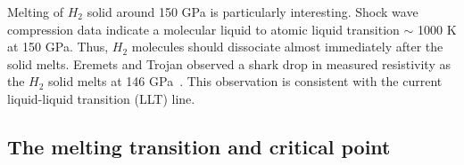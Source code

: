 Melting of $H_2$ solid around 150 GPa is particularly interesting. Shock wave compression data indicate a molecular liquid to atomic liquid transition $\sim$ 1000 K at 150 GPa. Thus, $H_2$ molecules should dissociate almost immediately after the solid melts. Eremets and Trojan observed a shark drop in measured resistivity as the $H_2$ solid melts at 146 GPa~\cite{Eremets2009}. This observation is consistent with the current liquid-liquid transition (LLT) line.


\subsection{The melting transition and critical point}
